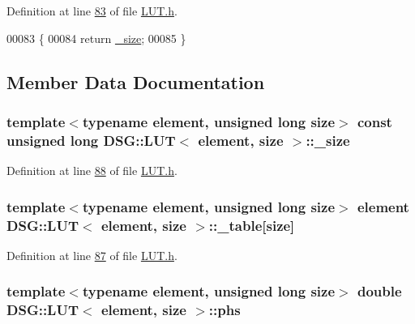 Definition at line \hyperlink{_l_u_t_8h_source_l00083}{83} of file \hyperlink{_l_u_t_8h_source}{L\+U\+T.\+h}.


\begin{DoxyCode}
00083                                         \{
00084             \textcolor{keywordflow}{return} \hyperlink{class_d_s_g_1_1_l_u_t_a87c352b5eaea2188955213c0f4ae9799}{\_size};
00085         \}
\end{DoxyCode}


\subsection{Member Data Documentation}
\hypertarget{class_d_s_g_1_1_l_u_t_a87c352b5eaea2188955213c0f4ae9799}{
\subsubsection[{\+\_\+size}]{\setlength{\rightskip}{0pt plus 5cm}template$<$typename element, unsigned long size$>$ const unsigned long {\bf D\+S\+G\+::\+L\+U\+T}$<$ element, size $>$\+::\+\_\+size\hspace{0.3cm}{\ttfamily [protected]}}}\label{class_d_s_g_1_1_l_u_t_a87c352b5eaea2188955213c0f4ae9799}


Definition at line \hyperlink{_l_u_t_8h_source_l00088}{88} of file \hyperlink{_l_u_t_8h_source}{L\+U\+T.\+h}.

\hypertarget{class_d_s_g_1_1_l_u_t_ac8b23bbb7ce259d4ceb1c6fa93a7f29f}{
\subsubsection[{\+\_\+table}]{\setlength{\rightskip}{0pt plus 5cm}template$<$typename element, unsigned long size$>$ element {\bf D\+S\+G\+::\+L\+U\+T}$<$ element, size $>$\+::\+\_\+table\mbox{[}size\mbox{]}\hspace{0.3cm}{\ttfamily [protected]}}}\label{class_d_s_g_1_1_l_u_t_ac8b23bbb7ce259d4ceb1c6fa93a7f29f}


Definition at line \hyperlink{_l_u_t_8h_source_l00087}{87} of file \hyperlink{_l_u_t_8h_source}{L\+U\+T.\+h}.

\hypertarget{class_d_s_g_1_1_l_u_t_a9ab8f8e89346c759e06f6d76c5b816cc}{
\subsubsection[{phs}]{\setlength{\rightskip}{0pt plus 5cm}template$<$typename element, unsigned long size$>$ double {\bf D\+S\+G\+::\+L\+U\+T}$<$ element, size $>$\+::phs\hspace{0.3cm}{\ttfamily [protected]}}}\label{class_d_s_g_1_1_l_u_t_a9ab8f8e89346c759e06f6d76c5b816cc}


